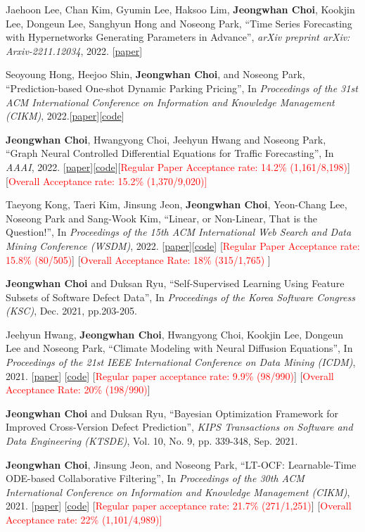 \documentclass[10pt]{article}
\newenvironment{changemargin}[2]{
  \begin{list}{}{
    \setlength{\topsep}{0pt}
    \setlength{\leftmargin}{#1}
    \setlength{\rightmargin}{#2}
    \setlength{\listparindent}{\parindent}
    \setlength{\itemindent}{\parindent}
    \setlength{\parsep}{\parskip}
  }
  \item[]}{\end{list}
}
\newcommand{\presentation}[2]{
	{#1} \hfill \emph{#2}\\ \bigskip
}
\newcommand{\RED}[1]{\textcolor{red}{#1}}
\newenvironment{body} {
	\vspace*{-16pt}
	\begin{changemargin}{-0.25in}{-0.5in}
  }
	{\end{changemargin}
}
\begin{document}
\begin{body}
\presentation{
Jaehoon Lee, Chan Kim, Gyumin Lee, Haksoo Lim, \textbf{Jeongwhan Choi}, Kookjin Lee, Dongeun Lee, Sanghyun Hong and Noseong Park, ``Time Series Forecasting with Hypernetworks Generating Parameters in Advance'', \emph{arXiv preprint arXiv: Arxiv-2211.12034}, 2022. [\href{https://arxiv.org/abs/2211.12034}{paper}]}{}
\presentation{Seoyoung Hong, Heejoo Shin, \textbf{Jeongwhan Choi}, and Noseong Park, ``Prediction-based One-shot Dynamic Parking Pricing'', In \emph{Proceedings of the 31st ACM International Conference on Information and Knowledge Management (CIKM)}, 2022.[\href{https://arxiv.org/abs/2208.14231}{paper}][\href{https://github.com/jeongwhanchoi/one-shot-optimization}{code}]}{}
\presentation{\textbf{Jeongwhan Choi}, Hwangyong Choi, Jeehyun Hwang and Noseong Park, ``Graph Neural Controlled Differential Equations for Traffic Forecasting'', In \emph{AAAI}, 2022. [\href{https://ojs.aaai.org/index.php/AAAI/article/download/20587/20346}{paper}][\href{https://github.com/jeongwhanchoi/STG-NCDE}{code}][\RED{Regular Paper Acceptance rate: 14.2\% (1,161/8,198)}] [\RED{Overall Acceptance rate: 15.2\% (1,370/9,020)] }} {}
\presentation{Taeyong Kong, Taeri Kim, Jinsung Jeon, \textbf{Jeongwhan Choi}, Yeon-Chang Lee, Noseong Park and Sang-Wook Kim, ``Linear, or Non-Linear, That is the Question!'', In \textit{Proceedings of the 15th ACM International Web Search and Data Mining Conference (WSDM)}, 2022.  [\href{https://arxiv.org/abs/2111.07265}{paper}][\href{https://github.com/jeongwhanchoi/HMLET}{code}] [\RED{Regular Paper Acceptance rate: 15.8\% (80/505)}] [\RED{Overall Acceptance Rate: 18\%  (315/1,765)} ]}{}
\presentation{\textbf{Jeongwhan Choi} and Duksan Ryu, ``Self-Supervised Learning Using Feature Subsets of Software Defect Data'',  In \emph{Proceedings of the Korea Software Congress (KSC)}, Dec. 2021, pp.203-205.}{}
\presentation{Jeehyun Hwang, \textbf{Jeongwhan Choi}, Hwangyong Choi, Kookjin Lee, Dongeun Lee and Noseong Park, ``Climate Modeling with Neural Diffusion Equations'', In \emph{Proceedings of the 21st IEEE International Conference on Data Mining (ICDM)}, 2021.  [\href{https://arxiv.org/abs/2111.06011}{paper}] [\href{https://github.com/jeongwhanchoi/Neural-Diffusion-Equation}{code}] [\RED{Regular paper acceptance rate: 9.9\%  (98/990)}] [\RED{Overall Acceptance Rate: 20\%  (198/990)}]}{}
\presentation{\textbf{Jeongwhan Choi} and Duksan Ryu, ``Bayesian Optimization Framework for Improved Cross-Version Defect Prediction'', \emph{KIPS Transactions on Software and Data Engineering (KTSDE)}, Vol. 10, No. 9, pp. 339-348, Sep. 2021.}{}
\presentation{\textbf{Jeongwhan Choi}, Jinsung Jeon, and Noseong Park, ``LT-OCF: Learnable-Time ODE-based Collaborative Filtering'', In \emph{Proceedings of the 30th ACM International Conference on Information and Knowledge Management (CIKM)}, 2021. [\href{https://arxiv.org/pdf/2108.06208.pdf}{paper}] [\href{https://github.com/jeongwhanchoi/LT-OCF}{code}]  [\RED{Regular paper acceptance rate: 21.7\% (271/1,251)}]  [\RED{Overall Acceptance rate: 22\% (1,101/4,989)]} }{}

\end{body}
\end{document}
